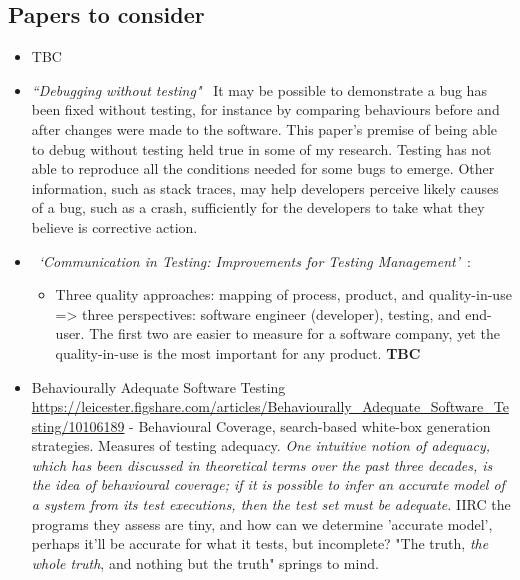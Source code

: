 \subsection{Papers to consider}
\begin{itemize}
    \item TBC
    \item \emph{``Debugging without testing"}~\cite{ghardallou2016debugging_without_testing} It may be possible to demonstrate a bug has been fixed without testing, for instance by comparing behaviours before and after changes were made to the software. This paper's premise of being able to debug without testing held true in some of my research. Testing has not able to reproduce all the conditions needed for some bugs to emerge. Other information, such as stack traces, may help developers perceive likely causes of a bug, such as a crash, sufficiently for the developers to take what they believe is corrective action.  
    
    \item ~\emph{`Communication in Testing: Improvements for Testing Management'}~\citep{paakkonen2009_communication_in_testing}: 
    \begin{itemize}
        \item Three quality approaches: mapping of process, product, and quality-in-use => three perspectives: software engineer (developer), testing, and end-user. The first two are easier to measure for a software company, yet the quality-in-use is the most important for any product. \textbf{TBC}
    \end{itemize}
    
    \item Behaviourally Adequate Software Testing \url{https://leicester.figshare.com/articles/Behaviourally_Adequate_Software_Testing/10106189} - Behavioural Coverage, search-based white-box generation strategies. Measures of testing adequacy. \emph{One intuitive notion of adequacy, which has been discussed in theoretical terms over the past three decades, is the idea of behavioural coverage; if it is possible to infer an accurate model of a system from its test executions, then the test set must be adequate.} IIRC the programs they assess are tiny, and how can we determine 'accurate model', perhaps it'll be accurate for what it tests, but incomplete? "The truth, \emph{the whole truth}, and nothing but the truth" springs to mind. %

\end{itemize}



